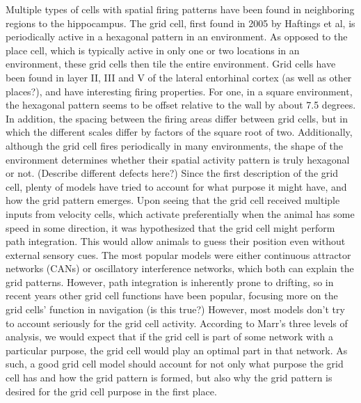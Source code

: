 \documentclass{article}
\begin{document}
    Multiple types of cells with spatial firing patterns have been found in neighboring regions to the hippocampus. The grid cell, first found in 2005 by Haftings et al, is periodically active in a hexagonal pattern in an environment. As opposed to the place cell, which is typically active in only one or two locations in an environment, these grid cells then tile the entire environment.
    Grid cells have been found in layer II, III and V of the lateral entorhinal cortex (as well as other places?), and have interesting firing properties. For one, in a square environment, the hexagonal pattern seems to be offset relative to the wall by about 7.5 degrees. In addition, the spacing between the firing areas differ between grid cells, but in which the different scales differ by factors of the square root of two. Additionally, although the grid cell fires periodically in many environments, the shape of the environment determines whether their spatial activity pattern is truly hexagonal or not.
    (Describe different defects here?)
    Since the first description of the grid cell, plenty of models have tried to account for what purpose it might have, and how the grid pattern emerges. Upon seeing that the grid cell received multiple inputs from velocity cells, which activate preferentially when the animal has some speed in some direction, it was hypothesized that the grid cell might perform path integration. This would allow animals to guess their position even without external sensory cues. The most popular models were either continuous attractor networks (CANs) or oscillatory interference networks, which both can explain the grid patterns.
    However, path integration is inherently prone to drifting, so in recent years other grid cell functions have been popular, focusing more on the grid cells' function in navigation (is this true?)
    However, most models don't try to account seriously for the grid cell activity. According to Marr's three levels of analysis, we would expect that if the grid cell is part of some network with a particular purpose, the grid cell would play an optimal part in that network. As such, a good grid cell model should account for not only what purpose the grid cell has and how the grid pattern is formed, but also why the grid pattern is desired for the grid cell purpose in the first place.
    
\end{document}
